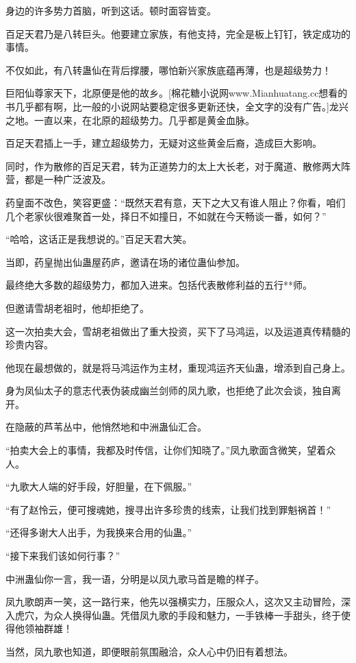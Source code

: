\begin{this_body}
身边的许多势力首脑，听到这话。顿时面容皆变。

百足天君乃是八转巨头。他要建立家族，有他支持，完全是板上钉钉，铁定成功的事情。

不仅如此，有八转蛊仙在背后撑腰，哪怕新兴家族底蕴再薄，也是超级势力！

巨阳仙尊家天下，北原便是他的故乡。[棉花糖小说网www.Mianhuatang.cc想看的书几乎都有啊，比一般的小说网站要稳定很多更新还快，全文字的没有广告。]龙兴之地。一直以来，在北原的超级势力。几乎都是黄金血脉。

百足天君插上一手，建立超级势力，无疑对这些黄金后裔，造成巨大影响。

同时，作为散修的百足天君，转为正道势力的太上大长老，对于魔道、散修两大阵营，都是一种广泛波及。

药皇面不改色，笑容更盛：“既然天君有意，天下之大又有谁人阻止？你看，咱们几个老家伙很难聚首一处，择日不如撞日，不如就在今天畅谈一番，如何？”

“哈哈，这话正是我想说的。”百足天君大笑。

当即，药皇抛出仙蛊屋药庐，邀请在场的诸位蛊仙参加。

最终绝大多数的超级势力，都加入进来。包括代表散修利益的五行**师。

但邀请雪胡老祖时，他却拒绝了。

这一次拍卖大会，雪胡老祖做出了重大投资，买下了马鸿运，以及运道真传精髓的珍贵内容。

他现在最想做的，就是将马鸿运作为主材，重现鸿运齐天仙蛊，增添到自己身上。

身为凤仙太子的意志代表伪装成幽兰剑师的凤九歌，也拒绝了此次会谈，独自离开。

在隐蔽的芦苇丛中，他悄然地和中洲蛊仙汇合。

“拍卖大会上的事情，我都及时传信，让你们知晓了。”凤九歌面含微笑，望着众人。

“九歌大人端的好手段，好胆量，在下佩服。”

“有了赵怜云，便可搜魂她，搜寻出许多珍贵的线索，让我们找到罪魁祸首！”

“还得多谢大人出手，为我换来合用的仙蛊。”

“接下来我们该如何行事？”

中洲蛊仙你一言，我一语，分明是以凤九歌马首是瞻的样子。

凤九歌朗声一笑，这一路行来，他先以强横实力，压服众人，这次又主动冒险，深入虎穴，为众人换得仙蛊。凭借凤九歌的手段和魅力，一手铁棒一手甜头，终于使得他领袖群雄！

当然，凤九歌也知道，即便眼前氛围融洽，众人心中仍旧有着想法。


\end{this_body}

